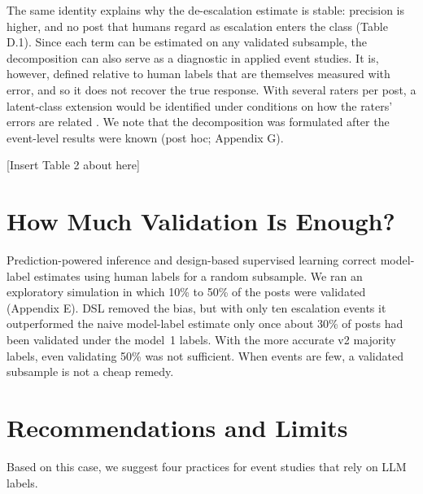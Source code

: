 \documentclass[12pt]{article}
\begin{document}
The same identity explains why the de-escalation estimate is stable: precision is higher, and no post that humans regard as escalation enters the class (Table D.1). Since each term can be estimated on any validated subsample, the decomposition can also serve as a diagnostic in applied event studies. It is, however, defined relative to human labels that are themselves measured with error, and so it does not recover the true response. With several raters per post, a latent-class extension would be identified under conditions on how the raters' errors are related \citep{hu2008}. We note that the decomposition was formulated after the event-level results were known (post hoc; Appendix G).

\begin{center}[Insert Table 2 about here]\end{center}

\section{How Much Validation Is Enough?}

Prediction-powered inference \citep{angelopoulos2023} and design-based supervised learning \citep[DSL;][]{egami2023} correct model-label estimates using human labels for a random subsample. We ran an exploratory simulation in which 10\% to 50\% of the posts were validated (Appendix E). DSL removed the bias, but with only ten escalation events it outperformed the naive model-label estimate only once about 30\% of posts had been validated under the model~1 labels. With the more accurate v2 majority labels, even validating 50\% was not sufficient. When events are few, a validated subsample is not a cheap remedy.

\section{Recommendations and Limits}

Based on this case, we suggest four practices for event studies that rely on LLM labels.
\end{document}
